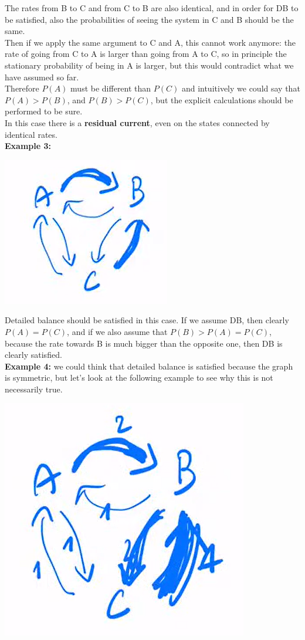 The rates from B to C and from C to B are also identical, and in order for DB to be satisfied, also the probabilities of seeing the system in C and B should be the same.\\
Then if we apply the same argument to C and A, this cannot work anymore: the rate of going from C to A is larger than going from A to C, so in principle the stationary probability of being in A is larger, but this would contradict what we have assumed so far.\\
Therefore $P(A)$ must be different than $P(C)$ and intuitively we could say that $P(A)>P(B)$, and $P(B)>P(C)$, but the explicit calculations should be performed to be sure.\\
In this case there is a \textbf{residual current}, even on the states connected by identical rates.
\smallskip
\\
\textbf{Example 3:}
\begin{center}\includegraphics[scale=0.5]{Monte Carlo/images/lect2/img2}\end{center}
Detailed balance should be satisfied in this case. If we assume DB, then clearly $P(A)=P(C)$, and if we also assume that $P(B)>P(A)=P(C)$, because the rate towards B is much bigger than the opposite one, then DB is clearly satisfied.
\smallskip
\\
\textbf{Example 4: }we could think that detailed balance is satisfied because the graph is symmetric, but let's look at the following example to see why this is not necessarily true.\\
\begin{center}\includegraphics[scale=0.5]{Monte Carlo/images/lect2/img3}\end{center}

